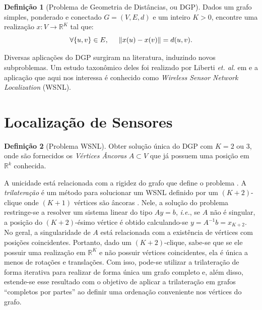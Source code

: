 \documentclass[a0,portrait]{a0poster}
\theoremstyle{plain}
\theoremstyle{definition}
\newtheorem{definicao}{Definição}[]
\begin{document}
\begin{multicols}{2}
\begin{definicao}[Problema de Geometria de Distâncias, ou DGP]
	Dados um grafo simples, ponderado e conectado $G = (V, E, d)$ e um inteiro $K>0$, encontre uma realização $x: V \longrightarrow \mathbb{R}^K$ tal que:
	\begin{equation}
		\forall \{u,v\} \in E, \hspace{0.5cm} \lVert x(u) - x(v) \rVert = d(u,v). \label{eq:DGP}
	\end{equation}
\end{definicao}

\noindent Diversas aplicações do DGP surgiram na literatura, induzindo novos subproblemas. Um estudo taxonômico deles foi realizado por Liberti \textit{et. al.} em \cite{carlileGDandAplications} e a aplicação que aqui nos interessa é conhecido como \textit{Wireless Sensor Network Localization} (WSNL).
\vspace{-1cm}
\section*{Localização de Sensores}
\vspace{-0.7cm}
\begin{definicao}[Problema WSNL]
	Obter solução única do DGP com $K= 2$ ou $3$, onde são fornecidos os \textit{Vértices Âncoras} $A\subset V$ que já possuem uma posição em $\mathbb{R}^k$ conhecida.\label{def:wsnl}
\end{definicao}

\noindent A unicidade está relacionada com a rigidez do grafo que define o problema \cite{eren2004rigidity}. A \textit{trilateração} é um método para solucionar um WSNL definido por um $(K+2)$-clique onde $(K+1)$ vértices são âncoras \cite{libertiEDG}. Nele, a solução do problema restringe-se a resolver um sistema linear do tipo $Ay = b$, \textit{i.e.}, se $A$ não é singular, a posição do $(K+2)$-ésimo vértice é obtido calculando-se $y = A^{-1}b = x_{K+2}$. No geral, a singularidade de $A$ está relacionada com a existência de vértices com posições coincidentes. Portanto, dado um $(K+2)$-clique, sabe-se que se ele possuir uma realização em $\mathbb{R}^K$ e não possuir vértices coincidentes, ela é única a menos de rotações e translações. Com isso, pode-se utilizar a trilateração de forma iterativa para realizar de forma única um grafo completo e, além disso, estende-se esse resultado com o objetivo de aplicar a trilateração em grafos ``completos por partes'' ao definir uma ordenação conveniente nos vértices do grafo.


\end{multicols}
\end{document}
